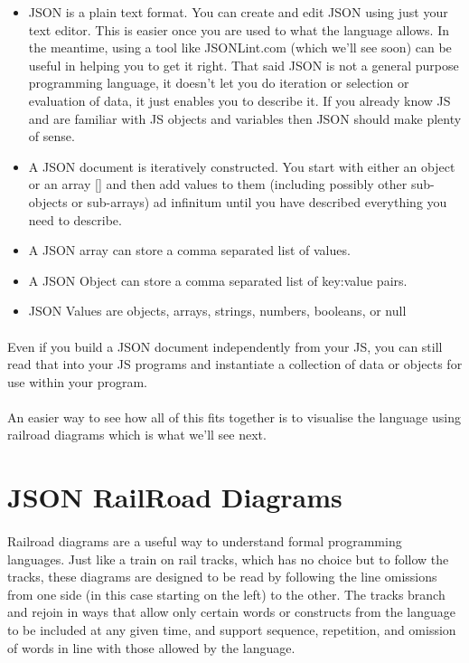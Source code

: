 \begin{itemize}
\item JSON is a plain text format. You can create and edit JSON using just your text editor. This is easier once you are used to what the language allows. In the meantime, using a tool like JSONLint.com (which we'll see soon) can be useful in helping you to get it right. That said JSON is not a general purpose programming language, it doesn't let you do iteration or selection or evaluation of data, it just enables you to describe it. If you already know JS and are familiar with JS objects and variables then JSON should make plenty of sense.
\item A JSON document is iteratively constructed. You start with either an object {} or an array [] and then add values to them (including possibly other sub-objects or sub-arrays) ad infinitum until you have described everything you need to describe.
\item A JSON array can store a comma separated list of values.
\item A JSON Object can store a comma separated list of key:value pairs.
\item JSON Values are objects, arrays, strings, numbers, booleans, or null
\end{itemize}

\paragraph{} Even if you build a JSON document independently from your JS, you can still read that into your JS programs and instantiate a collection of data or objects for use within your program.
\paragraph{} An easier way to see how all of this fits together is to visualise the language using railroad diagrams which is what we'll see next.



\section{JSON RailRoad Diagrams}
\paragraph{} Railroad diagrams are a useful way to understand formal programming languages. Just like a train on rail tracks, which has no choice but to follow the tracks, these diagrams are designed to be read by following the line omissions from one side (in this case starting on the left) to the other. The tracks branch and rejoin in ways that allow only certain words or constructs from the language to be included at any given time, and support sequence, repetition, and omission of words in line with those allowed by the language.
